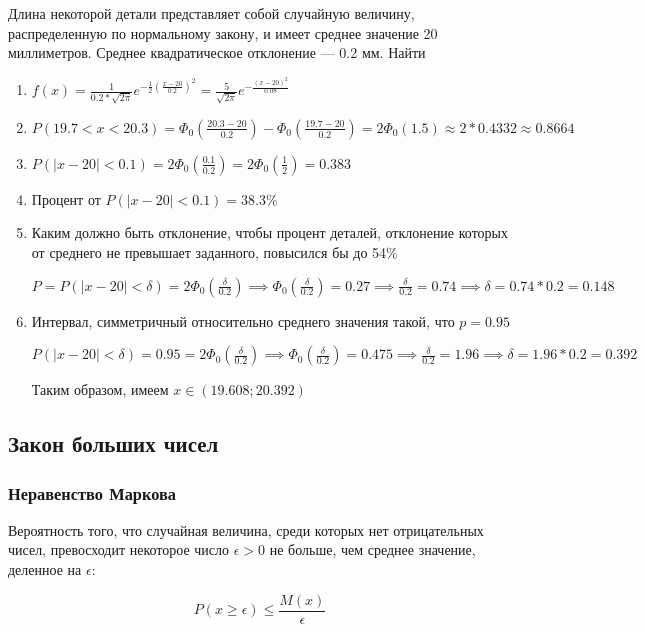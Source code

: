 \documentclass{article}
\begin{document}
Длина некоторой детали представляет собой случайную величину, распределенную по нормальному закону, и имеет среднее значение 20 миллиметров. Среднее квадратическое отклонение — 0.2 мм. Найти

\begin{enumerate}
    \item $f(x) = \frac{1}{0.2 * \sqrt{2\pi}} e^{-\frac{1}{2} (\frac{x - 20}{0.2})^2} = \frac{5}{\sqrt{2 \pi}} e^{-\frac{(x - 20)^2}{0.08}}$
    \item $P(19.7 < x < 20.3) = \Phi_0 (\frac{20.3 - 20}{0.2}) - \Phi_0 (\frac{19.7 - 20}{0.2}) = 2 \Phi_0(1.5) \approx 2 * 0.4332 \approx 0.8664$
    \item $P(|x - 20| < 0.1) = 2 \Phi_0 (\frac{0.1}{0.2}) = 2 \Phi_0 (\frac{1}{2}) = 0.383$
    \item Процент от $P(|x - 20| < 0.1) = 38.3\%$
    \item Каким должно быть отклонение, чтобы процент деталей, отклонение которых от среднего не превышает заданного, повысился бы до 54\%

    $P = P(|x - 20| < \delta) = 2 \Phi_0 (\frac{\delta}{0.2}) \implies \Phi_0 (\frac{\delta}{0.2}) = 0.27 \implies \frac{\delta}{0.2} = 0.74 \implies \delta = 0.74 * 0.2 = 0.148$
    \item Интервал, симметричный относительно среднего значения такой, что $p = 0.95$
    
    $P(|x - 20| < \delta) = 0.95 = 2 \Phi_0 (\frac{\delta}{0.2}) \implies \Phi_0 (\frac{\delta}{0.2}) = 0.475 \implies \frac{\delta}{0.2} = 1.96 \implies \delta = 1.96 * 0.2 = 0.392$

    Таким образом, имеем $x \in (19.608; 20.392)$
\end{enumerate}

\subsection{Закон больших чисел}

\subsubsection{Неравенство Маркова}

Вероятность того, что случайная величина, среди которых нет отрицательных чисел, превосходит некоторое число $\epsilon > 0$ не больше, чем среднее значение, деленное на $\epsilon$:

$$P(x \ge \epsilon) \le \frac{M(x)}{\epsilon}$$
\end{document}
